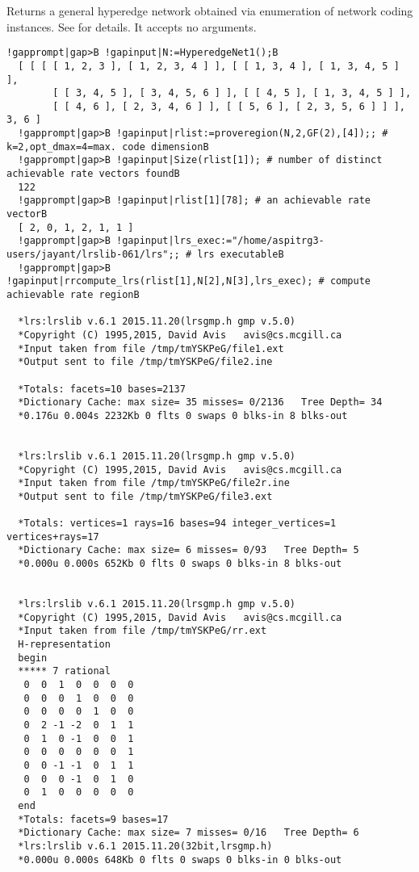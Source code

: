 \documentclass[a4paper,11pt]{report}
\begin{document}
{{{ Returns a general hyperedge network obtained via enumeration of network coding
instances. See \cite{lihyper15} for details. It accepts no arguments. }

 
\begin{Verbatim}[commandchars=!|B,fontsize=\small,frame=single,label=Example]
  !gapprompt|gap>B !gapinput|N:=HyperedgeNet1();B
  [ [ [ [ 1, 2, 3 ], [ 1, 2, 3, 4 ] ], [ [ 1, 3, 4 ], [ 1, 3, 4, 5 ] ],
        [ [ 3, 4, 5 ], [ 3, 4, 5, 6 ] ], [ [ 4, 5 ], [ 1, 3, 4, 5 ] ],
        [ [ 4, 6 ], [ 2, 3, 4, 6 ] ], [ [ 5, 6 ], [ 2, 3, 5, 6 ] ] ], 3, 6 ]
  !gapprompt|gap>B !gapinput|rlist:=proveregion(N,2,GF(2),[4]);; # k=2,opt_dmax=4=max. code dimensionB
  !gapprompt|gap>B !gapinput|Size(rlist[1]); # number of distinct achievable rate vectors foundB
  122
  !gapprompt|gap>B !gapinput|rlist[1][78]; # an achievable rate vectorB
  [ 2, 0, 1, 2, 1, 1 ]
  !gapprompt|gap>B !gapinput|lrs_exec:="/home/aspitrg3-users/jayant/lrslib-061/lrs";; # lrs executableB
  !gapprompt|gap>B !gapinput|rrcompute_lrs(rlist[1],N[2],N[3],lrs_exec); # compute achievable rate regionB
  
  *lrs:lrslib v.6.1 2015.11.20(lrsgmp.h gmp v.5.0)
  *Copyright (C) 1995,2015, David Avis   avis@cs.mcgill.ca
  *Input taken from file /tmp/tmYSKPeG/file1.ext
  *Output sent to file /tmp/tmYSKPeG/file2.ine
  
  *Totals: facets=10 bases=2137
  *Dictionary Cache: max size= 35 misses= 0/2136   Tree Depth= 34
  *0.176u 0.004s 2232Kb 0 flts 0 swaps 0 blks-in 8 blks-out
  
  
  *lrs:lrslib v.6.1 2015.11.20(lrsgmp.h gmp v.5.0)
  *Copyright (C) 1995,2015, David Avis   avis@cs.mcgill.ca
  *Input taken from file /tmp/tmYSKPeG/file2r.ine
  *Output sent to file /tmp/tmYSKPeG/file3.ext
  
  *Totals: vertices=1 rays=16 bases=94 integer_vertices=1  vertices+rays=17
  *Dictionary Cache: max size= 6 misses= 0/93   Tree Depth= 5
  *0.000u 0.000s 652Kb 0 flts 0 swaps 0 blks-in 8 blks-out
  
  
  *lrs:lrslib v.6.1 2015.11.20(lrsgmp.h gmp v.5.0)
  *Copyright (C) 1995,2015, David Avis   avis@cs.mcgill.ca
  *Input taken from file /tmp/tmYSKPeG/rr.ext
  H-representation
  begin
  ***** 7 rational
   0  0  1  0  0  0  0
   0  0  0  1  0  0  0
   0  0  0  0  1  0  0
   0  2 -1 -2  0  1  1
   0  1  0 -1  0  0  1
   0  0  0  0  0  0  1
   0  0 -1 -1  0  1  1
   0  0  0 -1  0  1  0
   0  1  0  0  0  0  0
  end
  *Totals: facets=9 bases=17
  *Dictionary Cache: max size= 7 misses= 0/16   Tree Depth= 6
  *lrs:lrslib v.6.1 2015.11.20(32bit,lrsgmp.h)
  *0.000u 0.000s 648Kb 0 flts 0 swaps 0 blks-in 0 blks-out
\end{Verbatim}
 

}}
\end{document}
